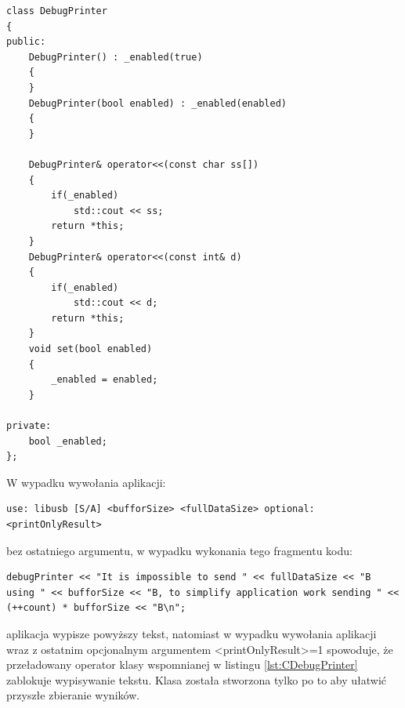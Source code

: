 \documentclass{BscUS}
\newcommand\blankpage{%
    \null
    \thispagestyle{empty}%
    \newpage}
\begin{document}
\begin{lstlisting}[caption={Klasa DebugPrinter},label={lst:CDebugPrinter}]
class DebugPrinter
{
public:
	DebugPrinter() : _enabled(true)
	{
	}
	DebugPrinter(bool enabled) : _enabled(enabled)
	{
	}
	
	DebugPrinter& operator<<(const char ss[])
	{
		if(_enabled)
			std::cout << ss;
		return *this;
	}
	DebugPrinter& operator<<(const int& d)
	{
		if(_enabled)
			std::cout << d;
		return *this;
	}
	void set(bool enabled)
	{
		_enabled = enabled;
	}

private:
	bool _enabled;
};
\end{lstlisting}
W wypadku wywołania aplikacji:
\begin{lstlisting}[caption={Uruchomienie testu}]
use: libusb [S/A] <bufforSize> <fullDataSize> optional:<printOnlyResult>
\end{lstlisting}
bez ostatniego argumentu, w wypadku wykonania tego fragmentu kodu: 
\begin{lstlisting}[caption={Wypisywanie w zależności od argumentu wywołania aplikacji}]
debugPrinter << "It is impossible to send " << fullDataSize << "B using " << bufforSize << "B, to simplify application work sending " << (++count) * bufforSize << "B\n";
\end{lstlisting}
aplikacja wypisze powyższy tekst, natomiast w wypadku wywołania aplikacji wraz z ostatnim opcjonalnym argumentem <printOnlyResult>=1 spowoduje, że przeładowany operator klasy wspomnianej w listingu \ref{lst:CDebugPrinter} zablokuje wypisywanie tekstu.
Klasa została stworzona tylko po to aby ułatwić przyszłe zbieranie wyników.
\afterpage{\blankpage}
\end{document}
